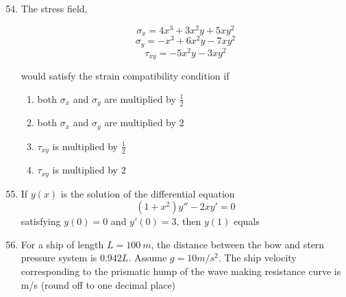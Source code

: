 \documentclass[journal]{IEEEtran}
\theoremstyle{remark}
\begin{document}
\begin{enumerate}[itemsep=1em]
\setcounter{enumi}{53}
\item The stress field, 
\begin{flushleft}
\[
\sigma_x = 4x^{3} + 3x^{2}y + 5xy^{2}
\]
\[
\sigma_y = -x^{3} + 6x^{2}y - 7xy^{2}
\]
\[
\tau_{xy} = -5x^{2}y - 3xy^{2}
\]
\end{flushleft}

would satisfy the strain compatibility condition if 
\begin{enumerate}[leftmargin=2.5em, labelsep=0.5em, itemsep=0.5em]
    \item both $\sigma_x$ and $\sigma_y$ are multiplied by $\frac{1}{2}$ 
    \item both $\sigma_x$ and $\sigma_y$ are multiplied by $2$
    \item $\tau_{xy}$ is multiplied by $\frac{1}{2}$
    \item $\tau_{xy}$ is multiplied by $2$
\end{enumerate}
\end{enumerate}

\newpage
\vspace*{0.25cm}

\begin{enumerate}[itemsep=1em]
\setcounter{enumi}{54}
\item If $y(x)$  is the solution of the differential equation  
\[
(1+x^2)y''-2xy'=0
\]
satisfying  $y(0)=0$ and  $y'(0)=3$, then  $y(1)$ equals \underline{\hspace{1cm}} 
\end{enumerate}

\begin{enumerate}[itemsep=1em]
\setcounter{enumi}{55}
\item For a ship of length $L = 100\ m$, the distance between the bow and stern pressure system is $0.942L$. Assume $g = 10 m/s^2$. The ship velocity corresponding to the prismatic hump of the wave making resistance curve is \underline{\hspace{3cm}} m/s (round off to one decimal place)  
\end{enumerate}
\end{document}
